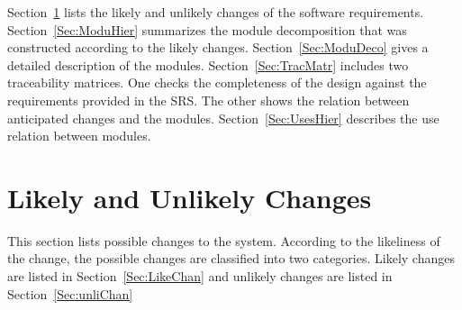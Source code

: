 \documentclass[12pt]{article}
\begin{document}
Section~\ref{Sec:LikeandUnliChan}  lists the likely and unlikely changes of the software requirements. Section~\ref{Sec:ModuHier}  summarizes the module decomposition that was constructed according to the likely changes. Section~\ref{Sec:ModuDeco}  gives a detailed description of the modules. Section~\ref{Sec:TracMatr}  includes two traceability matrices. One checks the completeness of the design against the requirements provided in the SRS. The other shows the relation between anticipated changes and the modules. Section~\ref{Sec:UsesHier}  describes the use relation between modules.
\section{Likely and Unlikely Changes}
\label{Sec:LikeandUnliChan}
This section lists possible changes to the system. According to the likeliness of the change, the possible changes are classified into two categories. Likely changes are listed in Section~\ref{Sec:LikeChan} and unlikely changes are listed in Section~\ref{Sec:unliChan}
\end{document}
